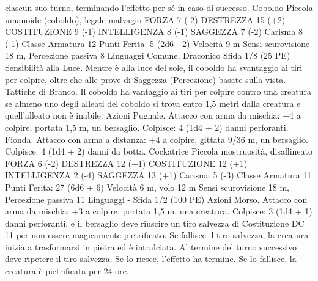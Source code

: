 \begin{multicols}{2}
ciascun suo turno, terminando l’effetto per sé in caso di successo.
Coboldo
Piccola umanoide (coboldo), legale malvagio
FORZA 7 (-2)
DESTREZZA 15 (+2)
COSTITUZIONE 9 (-1)
INTELLIGENZA 8 (-1)
SAGGEZZA 7 (-2)
Carisma 8 (-1)
Classe Armatura 12
\hspace*{0pt}\hfill{Punti Ferita}: 5 (2d6 - 2)
Velocità 9 m
Sensi scurovisione 18 m, Percezione passiva 8
Linguaggi Comune, Draconico
Sfida 1/8 (25 PE)
Sensibilità alla Luce. Mentre è alla luce del sole, il coboldo ha
svantaggio ai tiri per colpire, oltre che alle prove di Saggezza
(Percezione) basate sulla vista.
Tattiche di Branco. Il coboldo ha vantaggio ai tiri per colpire
contro una creatura se almeno uno degli alleati del coboldo si
trova entro 1,5 metri dalla creatura e quell’alleato non è inabile.
Azioni
Pugnale. Attacco con arma da mischia: +4 a colpire, portata 1,5
m, un bersaglio.
Colpisce: 4 (1d4 + 2) danni perforanti.
Fionda. Attacco con arma a distanza: +4 a colpire, gittata 9/36
m, un bersaglio.
Colpisce: 4 (1d4 + 2) danni da botta.
Cockatrice
Piccola mostruosità, disallineato
FORZA 6 (-2)
DESTREZZA 12 (+1)
COSTITUZIONE 12 (+1)
INTELLIGENZA 2 (-4)
SAGGEZZA 13 (+1)
Carisma 5 (-3)
Classe Armatura 11
\hspace*{0pt}\hfill{Punti Ferita}: 27 (6d6 + 6)
Velocità 6 m, volo 12 m
Sensi scurovisione 18 m, Percezione passiva 11
Linguaggi -
Sfida 1/2 (100 PE)
Azioni
Morso. Attacco con arma da mischia: +3 a colpire, portata 1,5
m, una creatura.
Colpisce: 3 (1d4 + 1) danni perforanti, e il bersaglio deve
riuscire un tiro salvezza di Costituzione DC 11 per non essere
magicamente pietrificato. Se fallisce il tiro salvezza, la creatura
inizia a trasformarsi in pietra ed è intralciata. Al termine del
turno successivo deve ripetere il tiro salvezza. Se lo riesce,
l’effetto ha termine. Se lo fallisce, la creatura è pietrificata per 24
ore.
 

\end{multicols}
